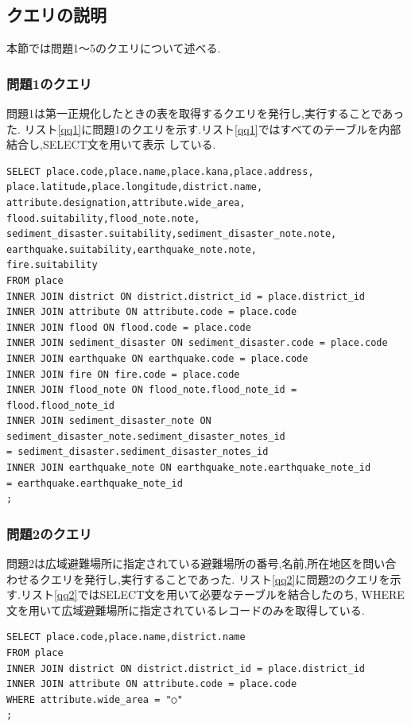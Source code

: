 \documentclass[a4j]{jarticle}
\begin{document}
    \subsection{クエリの説明}
    本節では問題1～5のクエリについて述べる.
    \subsubsection{問題1のクエリ}
    問題1は第一正規化したときの表を取得するクエリを発行し,実行することであった.
    リスト\ref{qq1}に問題1のクエリを示す.リスト\ref{qq1}ではすべてのテーブルを内部結合し,SELECT文を用いて表示
    している.
    \begin{lstlisting}[basicstyle=\ttfamily\footnotesize, frame=single,label=qq1,caption=問題1のクエリ]
SELECT place.code,place.name,place.kana,place.address,
place.latitude,place.longitude,district.name,
attribute.designation,attribute.wide_area,
flood.suitability,flood_note.note,
sediment_disaster.suitability,sediment_disaster_note.note,
earthquake.suitability,earthquake_note.note,
fire.suitability
FROM place
INNER JOIN district ON district.district_id = place.district_id
INNER JOIN attribute ON attribute.code = place.code
INNER JOIN flood ON flood.code = place.code
INNER JOIN sediment_disaster ON sediment_disaster.code = place.code
INNER JOIN earthquake ON earthquake.code = place.code
INNER JOIN fire ON fire.code = place.code
INNER JOIN flood_note ON flood_note.flood_note_id = flood.flood_note_id
INNER JOIN sediment_disaster_note ON sediment_disaster_note.sediment_disaster_notes_id 
= sediment_disaster.sediment_disaster_notes_id
INNER JOIN earthquake_note ON earthquake_note.earthquake_note_id 
= earthquake.earthquake_note_id
;
               \end{lstlisting}

    \subsubsection{問題2のクエリ}
    問題2は広域避難場所に指定されている避難場所の番号,名前,所在地区を問い合わせるクエリを発行し,実行することであった.
    リスト\ref{qq2}に問題2のクエリを示す.リスト\ref{qq2}ではSELECT文を用いて必要なテーブルを結合したのち,
    WHERE文を用いて広域避難場所に指定されているレコードのみを取得している.
    \begin{lstlisting}[basicstyle=\ttfamily\footnotesize, frame=single,label=qq2,caption=問題2のクエリ]
SELECT place.code,place.name,district.name
FROM place
INNER JOIN district ON district.district_id = place.district_id
INNER JOIN attribute ON attribute.code = place.code
WHERE attribute.wide_area = "○"
;
    \end{lstlisting}
\end{document}
